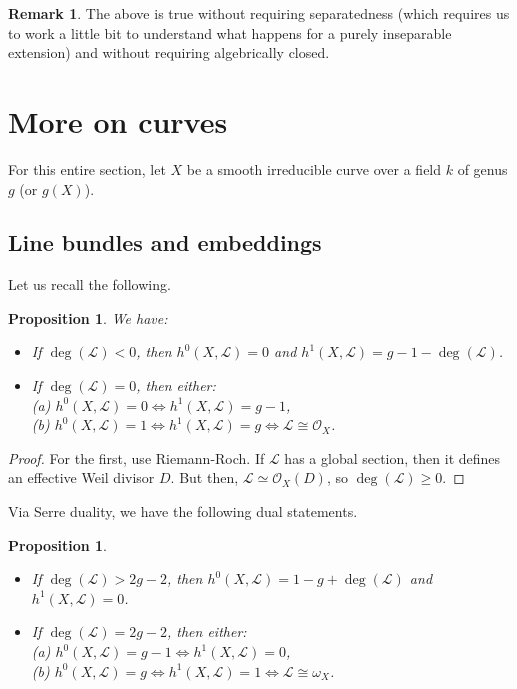 \documentclass[10pt]{article}
\newtheorem{prop}[thm]{Proposition}
\theoremstyle{definition}
\newtheorem{rmk}[thm]{Remark}
\newcommand{\OO}{\mathcal{O}}
\newcommand{\LL}{\mathcal{L}}
\begin{document}
\begin{rmk}
The above is true without requiring separatedness (which requires us to work a little bit to understand what happens for a purely inseparable extension) and without requiring algebrically closed.
\end{rmk}




\newpage


\section{More on curves}

For this entire section, let $X$ be a smooth irreducible curve over a field $k$ of genus $g$ (or $g(X)$).

\subsection{Line bundles and embeddings}


Let us recall the following.
\begin{prop}
We have:
\begin{itemize}
\item If $\deg(\mathcal{L}) < 0$, then $h^0(X, \mathcal{L}) = 0$ and $h^1(X, \LL) = g-1- \deg(\LL)$.
\item If $\deg(\LL) = 0$, then either: \\
\indent (a) $h^0(X, \LL) = 0 \Leftrightarrow h^1(X, \LL) = g-1$,\\
\indent (b) $h^0(X, \LL) = 1 \Leftrightarrow h^1(X, \LL) = g \Leftrightarrow \LL \cong \OO_X$.
\end{itemize}
\end{prop}
\begin{proof}
For the first, use Riemann-Roch.  If $\LL$ has a global section, then it defines an effective Weil divisor $D$.  But then, $\LL \simeq \OO_X(D)$, so $\deg(\LL) \geq 0$.
\end{proof}

Via Serre duality, we have the following dual statements.
\begin{prop}
\begin{itemize}
We have:
\item If $\deg(\mathcal{L}) > 2g-2$, then $h^0(X, \LL) = 1-g+ \deg(\LL)$ and $h^1(X, \mathcal{L}) = 0$.
\item If $\deg(\LL) = 2g-2$, then either: \\
\indent (a) $h^0(X, \LL) = g-1 \Leftrightarrow h^1(X, \LL) = 0$,\\
\indent (b) $h^0(X, \LL) = g \Leftrightarrow h^1(X, \LL) = 1 \Leftrightarrow \LL \cong \omega_X$.
\end{itemize}
\end{prop}
\end{document}
